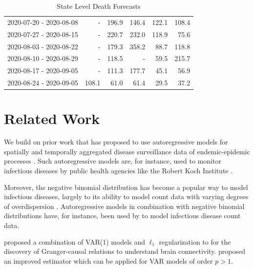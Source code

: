 \documentclass[nobib]{tufte-handout}
\begin{document}
\begin{table}
\begin{tabular}{lrrrrr}
2020-07-20 - 2020-08-08 &  -  & 196.9 & 146.4 & 122.1 & \cellcolor{red} 108.4 \\
2020-07-27 - 2020-08-15 &  -  & 220.7 & 232.0 & 118.9 & \cellcolor{red} 75.6 \\
2020-08-03 - 2020-08-22 &  -  & 179.3 & 358.2 & \cellcolor{red} 88.7 & 118.8 \\
2020-08-10 - 2020-08-29 &  -  & 118.5 &  -  & \cellcolor{red} 59.5 & 215.7 \\
2020-08-17 - 2020-09-05 &  -  & 111.3 & 177.7 & \cellcolor{red} 45.1 & 56.9 \\
2020-08-24 - 2020-09-05 & 108.1 & 61.0 & 61.4 & \cellcolor{red} 29.5 & 37.2 \\
\bottomrule
\end{tabular}
\vspace*{2em}
\caption{State Level Death Forecasts \label{tab:state-deaths}}
\end{table}

\section{Related Work}
\label{sec:org4064e60}
We build on prior work that has proposed to use autoregressive models
for spatially and temporally aggregated disease surveillance data of endemic-epidemic
processes \citep{held2005statistical,meyer2014powerlaw,meyer2016socialcontact}.
Such autoregressive models are, for instance, used to monitor infectious
diseases by public health agencies like the Robert Koch Institute
\citep{salmon2016surveillance}.

Moreover, the negative binomial distribution has become a popular way to model
infectious diseases, largely to its ability to model count data with varying degrees
of overdispersion \citep{lloyd_smith2007negativebinomial}. Autoregressive models
in combination with negative binomial distributions have, for instance, been
used by \citet{bauer2018stratified,wakefield2019spatio,held2005statistical} to
model infectious disease count data.

\citet{valdes2005estimating} proposed a combination of VAR(1) models and \(\ell_1\)
regularization to for the discovery of Granger-causal relations to understand
brain connectivity. \citet{haufe2010sparse} proposed an improved estimator which
can be applied for VAR models of order \(p > 1\).
\end{document}

